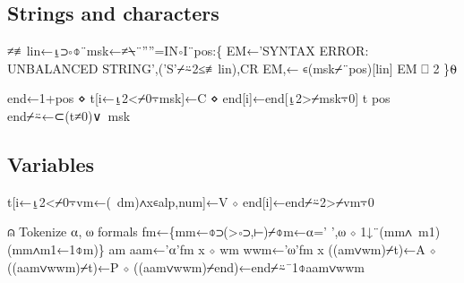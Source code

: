 \documentclass{article}%
\begin{document}
\subsection{Strings and characters}

\nwenddocs{}\endmoddef\nwstartdeflinemarkup{}≠≢lin←⍸⊃∘⌽¨msk←≠⍀¨''''=IN∘I¨pos:\{
        EM←'SYNTAX ERROR: UNBALANCED STRING',('S'⌿⍨2≤≢lin),CR
        EM,← ∊(msk⌿¨pos)[lin]
        EM ⎕ 2
\}⍬
\nwendcode{}\nwdocspar

\nwenddocs{}\endmoddef\nwstartdeflinemarkup{}\nwenddeflinemarkup
end←1+pos ⋄ t[i←⍸2<⌿0⍪msk]←C ⋄ end[i]←end[⍸2>⌿msk⍪0]
t pos end⌿⍨←⊂(t≠0)∨~msk
\nwendcode{}\nwdocspar

\subsection{Variables}

\nwenddocs{}\endmoddef\nwstartdeflinemarkup{}\nwenddeflinemarkup
t[i←⍸2<⌿0⍪vm←(~dm)∧x∊alp,num]←V ⋄ end[i]←end⌿⍨2>⌿vm⍪0

⍝ Tokenize ⍺, ⍵ formals
fm←\{mm←⌽⊃(>∘⊃,⊢)⌿⌽m←⍺=' ',⍵ ⋄ 1↓¨(mm∧~m1)(mm∧m1←1⌽m)\}
am aam←'⍺'fm x ⋄ wm wwm←'⍵'fm x
((am∨wm)⌿t)←A ⋄ ((aam∨wwm)⌿t)←P ⋄ ((aam∨wwm)⌿end)←end⌿⍨¯1⌽aam∨wwm
\nwendcode{}\nwdocspar
\end{document}

